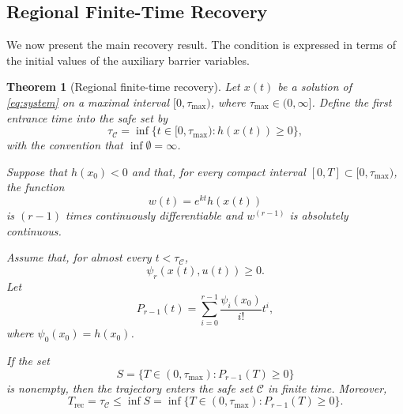 \documentclass[11pt]{article}
\newtheorem{theorem}{Theorem}
\newcommand{\safeSet}{\mathcal{C}}
\newcommand{\Trec}{T_{\mathrm{rec}}}
\newcommand{\taumax}{\tau_{\max}}
\newcommand{\tauC}{\tau_{\mathcal C}}
\begin{document}
\subsection{Regional Finite-Time Recovery}

We now present the main recovery result. The condition is expressed in terms of the initial values of the auxiliary barrier variables.

\begin{theorem}[Regional finite-time recovery]
\label{thm:general-recovery}
Let $x(t)$ be a solution of \eqref{eq:system} on a maximal interval $[0,\taumax)$, where $\taumax\in(0,\infty]$. Define the first entrance time into the safe set by
\begin{equation}
\tauC
=
\inf\{t\in[0,\taumax): h(x(t))\ge0\},
\label{eq:first-entrance-time}
\end{equation}
with the convention that $\inf\emptyset=\infty$.

Suppose that $h(x_0)<0$ and that, for every compact interval $[0,T]\subset[0,\taumax)$, the function
\begin{equation}
w(t)=e^{kt}h(x(t))
\end{equation}
is $(r-1)$ times continuously differentiable and $w^{(r-1)}$ is absolutely continuous.

Assume that, for almost every $t<\tauC$,
\begin{equation}
\psi_r(x(t),u(t))\ge0.
\label{eq:enforced-constraint}
\end{equation}
Let
\begin{equation}
P_{r-1}(t)
=
\sum_{i=0}^{r-1}
\frac{\psi_i(x_0)}{i!}t^i,
\label{eq:recovery-polynomial}
\end{equation}
where $\psi_0(x_0)=h(x_0)$.

If the set
\begin{equation}
S
=
\{T\in(0,\taumax): P_{r-1}(T)\ge0\}
\label{eq:crossing-set}
\end{equation}
is nonempty, then the trajectory enters the safe set $\safeSet$ in finite time. Moreover,
\begin{equation}
\Trec
=
\tauC
\le
\inf S
=
\inf
\{
T\in(0,\taumax):
P_{r-1}(T)\ge0
\}.
\label{eq:general-time-bound}
\end{equation}
\end{theorem}
\end{document}
